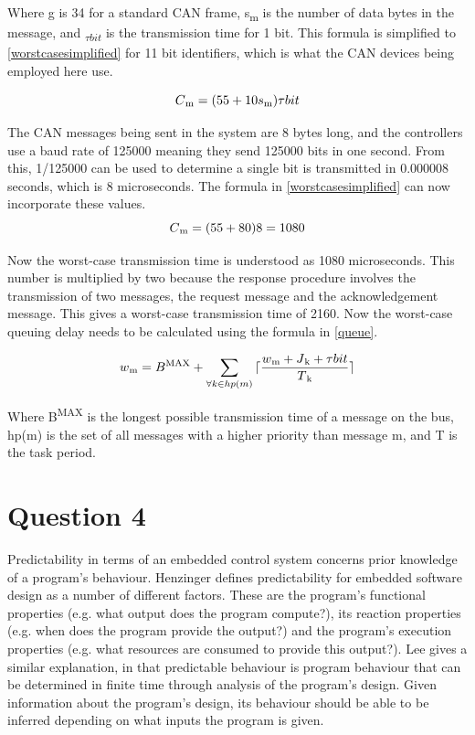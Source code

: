 \documentclass[]{report}
\begin{document}
		Where g is 34 for a standard CAN frame, s\textsubscript{m} is the number of data bytes in the message, and \textsubscript{$\tau bit$} is the transmission time for 1 bit. This formula is simplified to \ref{worstcasesimplified} for 11 bit identifiers, which is what the CAN devices being employed here use.
		
		\begin{equation}
		\label{worstcasesimplified}
		C\textsubscript{m} = (55 + 10s\textsubscript{m})\tau bit
		\end{equation}
		
		The CAN messages being sent in the system are 8 bytes long, and the controllers use a baud rate of 125000 meaning they send 125000 bits in one second. From this, 1/125000 can be used to determine a single bit is transmitted in 0.000008 seconds, which is 8 microseconds. The formula in \ref{worstcasesimplified} can now incorporate these values.
		\begin{equation}
		\label{worstcasesimplifiedrealnumbers}
		C\textsubscript{m} = (55 + 80)8 = 1080
		\end{equation}
		\medskip
		
		Now the worst-case transmission time is understood as 1080 microseconds. This number is multiplied by two because the response procedure involves the transmission of two messages, the request message and the acknowledgement message. This gives a worst-case transmission time of 2160.  Now the worst-case queuing delay needs to be calculated using the formula in \ref{queue}.
		
		\begin{equation}
		\label{queue}
		w\textsubscript{m} = B\textsuperscript{MAX} + \sum_{\forall k \in hp(m)}{\lceil \frac{w\textsubscript{m} + J\textsubscript{k} + \tau bit}{T\textsubscript{k}} \rceil}
		\end{equation}
		
		Where B\textsuperscript{MAX} is the longest possible transmission time of a message on the bus, hp(m) is the set of all messages with a higher priority than message m, and T is the task period.
		
		\section{Question 4}
		Predictability in terms of an embedded control system concerns prior knowledge of a program's behaviour. Henzinger\cite{henzinger2008two} defines predictability for embedded software design as a number of different factors. These are the program's functional properties (e.g. what output does the program compute?), its reaction properties (e.g. when does the program provide the output?) and the program's execution properties (e.g. what resources are consumed to provide this output?). Lee\cite{Lee:EECS-2009-30} gives a similar explanation, in that predictable behaviour is program behaviour that can be determined in finite time through analysis of the program's design. Given information about the program's design, its behaviour should be able to be inferred depending on what inputs the program is given.
		\medskip
		
\end{document}
